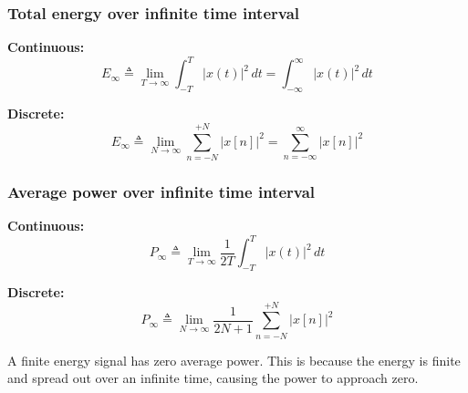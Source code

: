     \subsubsection{Total energy over infinite time interval}
    \begin{definition}

        \textbf{Continuous:}
        \begin{equation}
            E_{\infty} \triangleq \lim_{T \to \infty} \int_{-T}^{T} |x(t)|^2 \, dt = \int_{-\infty}^{\infty} |x(t)|^2 \, dt
        \end{equation}

        \textbf{Discrete:}
        \begin{equation}
            E_{\infty} \triangleq \lim_{N \to \infty} \sum_{n=-N}^{+N} |x[n]|^2 = \sum_{n=-\infty}^{\infty} |x[n]|^2
        \end{equation}
    \end{definition}

    \subsubsection{Average power over infinite time interval}
    \begin{definition}

        \textbf{Continuous:}
        \begin{equation}
            P_{\infty} \triangleq \lim_{T \to \infty} \frac{1}{2T} \int_{-T}^{T} |x(t)|^2 \, dt
        \end{equation}

        \textbf{Discrete:}
        \begin{equation}
            P_{\infty} \triangleq \lim_{N \to \infty} \frac{1}{2N + 1} \sum_{n=-N}^{+N} |x[n]|^2
        \end{equation}
    \end{definition}

    \begin{intuition}
        A finite energy signal has zero average power. This is because the energy is finite and spread out over an infinite time, causing the power to approach zero.
    \end{intuition}